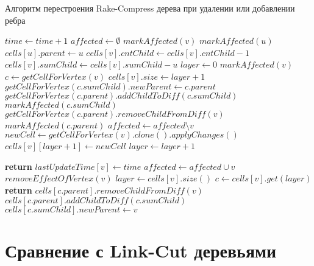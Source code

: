 \FloatBarrier
\begin{algorithm}
\caption{Алгоритм перестроения Rake-Compress дерева при удалении или добавлении ребра}\label{algo:rebuilding_rc}
\begin{algorithmic}[1]
\State $time \gets time + 1$
\State $affected \gets \emptyset$
\State $markAffected(v)$ 
\State $markAffected(u)$
\State $cells[u].parent \gets u$
\State $cells[v].cntChild \gets cells[v].cntChild - 1$
\State $cells[v].sumChild \gets cells[v].sumChild - u$
\State $layer \gets 0$
		\State $markAffected(v)$
	\EndFor
		\State $c \gets getCellForVertex(v)$
			\State $cells[v].size \gets layer + 1$
				\State $getCellForVertex(c.sumChild).newParent \gets c.parent$
				\State $getCellForVertex(c.parent).addChildToDiff(c.sumChild)$
				\State $markAffected(c.sumChild)$
			\EndIf
				\State $getCellForVertex(c.parent).removeChildFromDiff(v)$
				\State $markAffected(c.parent)$
			\EndIf
			\State $affected \gets affected \setminus v$
		\EndIf
	\EndFor
		\State $newCell \gets getCellForVertex(v).clone().applyChanges()$ 
		\State $cells[v][layer + 1] \gets newCell$
	\EndFor
	\State $layer \gets layer + 1$
\EndWhile

\Statex

		\State \textbf{return} 
	\EndIf
	\State $lastUpdateTime[v] \gets time$
	\State $affected \gets affected \cup v$
	\State $removeEffectOfVertex(v)$
\EndProcedure
{}
	\State $layer \gets cells[v].size()$
	\State $c \gets cells[v].get(layer)$
		\State \textbf{return}
	\EndIf
	\State $cells[c.parent].removeChildFromDiff(v)$
		\State $cells[c.parent].addChildToDiff(c.sumChild)$
		\State $cells[c.sumChild].newParent \gets v$
	\EndIf
\EndProcedure

\end{algorithmic}
\end{algorithm}

\FloatBarrier
\section{Сравнение с Link-Cut деревьями}   

